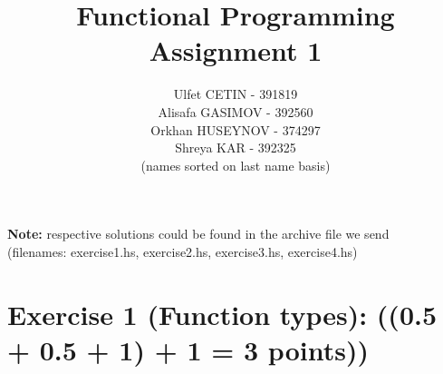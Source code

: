 \documentclass[10pt]{article}
\begin{document}

\author{
	Ulfet CETIN - 391819\\
	Alisafa GASIMOV - 392560\\
	Orkhan HUSEYNOV - 374297\\	
	Shreya KAR - 392325\\
	(names sorted on last name basis)	
}
\title{
	Functional Programming\\
	Assignment 1
}

\maketitle

\textbf{Note:} respective solutions could be found in the archive file we send\\
(filenames: exercise1.hs, exercise2.hs, exercise3.hs, exercise4.hs)

\section*{Exercise 1 (Function types): ((0.5 + 0.5 + 1) + 1 = 3 points))}
\end{document}

